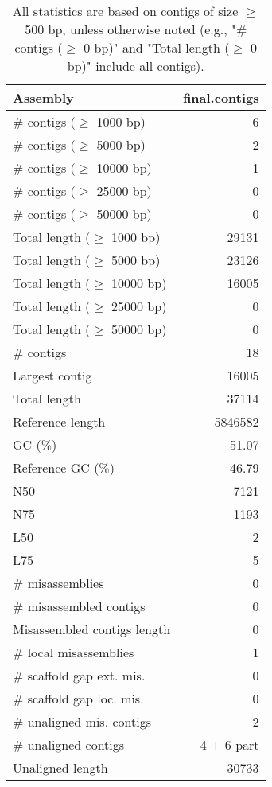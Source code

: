 \documentclass[12pt,a4paper]{article}
\begin{document}
\begin{table}[ht]
\begin{center}
\caption{All statistics are based on contigs of size $\geq$ 500 bp, unless otherwise noted (e.g., "\# contigs ($\geq$ 0 bp)" and "Total length ($\geq$ 0 bp)" include all contigs).}
\begin{tabular}{|l*{1}{|r}|}
\hline
Assembly & final.contigs \\ \hline
\# contigs ($\geq$ 1000 bp) & 6 \\ \hline
\# contigs ($\geq$ 5000 bp) & 2 \\ \hline
\# contigs ($\geq$ 10000 bp) & 1 \\ \hline
\# contigs ($\geq$ 25000 bp) & 0 \\ \hline
\# contigs ($\geq$ 50000 bp) & 0 \\ \hline
Total length ($\geq$ 1000 bp) & 29131 \\ \hline
Total length ($\geq$ 5000 bp) & 23126 \\ \hline
Total length ($\geq$ 10000 bp) & 16005 \\ \hline
Total length ($\geq$ 25000 bp) & 0 \\ \hline
Total length ($\geq$ 50000 bp) & 0 \\ \hline
\# contigs & 18 \\ \hline
Largest contig & 16005 \\ \hline
Total length & 37114 \\ \hline
Reference length & 5846582 \\ \hline
GC (\%) & 51.07 \\ \hline
Reference GC (\%) & 46.79 \\ \hline
N50 & 7121 \\ \hline
N75 & 1193 \\ \hline
L50 & 2 \\ \hline
L75 & 5 \\ \hline
\# misassemblies & 0 \\ \hline
\# misassembled contigs & 0 \\ \hline
Misassembled contigs length & 0 \\ \hline
\# local misassemblies & 1 \\ \hline
\# scaffold gap ext. mis. & 0 \\ \hline
\# scaffold gap loc. mis. & 0 \\ \hline
\# unaligned mis. contigs & 2 \\ \hline
\# unaligned contigs & 4 + 6 part \\ \hline
Unaligned length & 30733 \\ \hline

\end{tabular}
\end{center}
\end{table}
\end{document}
